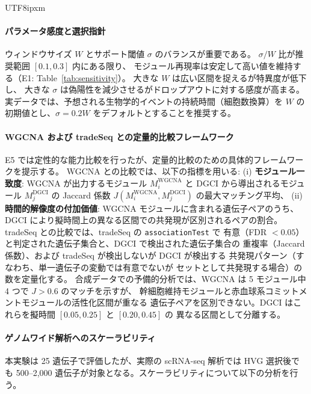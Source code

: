 \documentclass[11pt,a4paper]{article}
\begin{document}
\begin{CJK}{UTF8}{ipxm}
\paragraph{パラメータ感度と選択指針}
ウィンドウサイズ $W$ とサポート閾値 $\sigma$ のバランスが重要である。
$\sigma / W$ 比が推奨範囲 $[0.1, 0.3]$ 内にある限り、
モジュール再現率は安定して高い値を維持する（E1: Table~\ref{tab:sensitivity}）。
大きな $W$ は広い区間を捉えるが特異度が低下し、
大きな $\sigma$ は偽陽性を減少させるがドロップアウトに対する感度が高まる。
実データでは、予想される生物学的イベントの持続時間（細胞数換算）を
$W$ の初期値とし、$\sigma = 0.2 W$ をデフォルトとすることを推奨する。

\paragraph{WGCNA および tradeSeq との定量的比較フレームワーク}
E5 では定性的な能力比較を行ったが、定量的比較のための具体的フレームワークを提示する。
WGCNA との比較では、以下の指標を用いる:
(i) \textbf{モジュール一致度}: WGCNA が出力するモジュール $M_i^{\text{WGCNA}}$ と
DGCI から導出されるモジュール $M_j^{\text{DGCI}}$ の Jaccard 係数
$J(M_i^{\text{WGCNA}}, M_j^{\text{DGCI}})$ の最大マッチング平均、
(ii) \textbf{時間的解像度の付加価値}: WGCNA モジュールに含まれる遺伝子ペアのうち、
DGCI により擬時間上の異なる区間での共発現が区別されるペアの割合。
tradeSeq との比較では、tradeSeq の \texttt{associationTest} で
有意（FDR $< 0.05$）と判定された遺伝子集合と、DGCI で検出された遺伝子集合の
重複率（Jaccard 係数）、および tradeSeq が検出しないが DGCI が検出する
共発現パターン（すなわち、単一遺伝子の変動では有意でないが
セットとして共発現する場合）の数を定量化する。
合成データでの予備的分析では、WGCNA は 5 モジュール中 4 つで $J > 0.6$ のマッチを示すが、
幹細胞維持モジュールと赤血球系コミットメントモジュールの活性化区間が重なる
遺伝子ペアを区別できない。DGCI はこれらを擬時間 $[0.05, 0.25]$ と $[0.20, 0.45]$ の
異なる区間として分離する。

\paragraph{ゲノムワイド解析へのスケーラビリティ}
本実験は 25 遺伝子で評価したが、実際の scRNA-seq 解析では HVG 選択後でも
500--2,000 遺伝子が対象となる。スケーラビリティについて以下の分析を行う。


\end{CJK}
\end{document}
